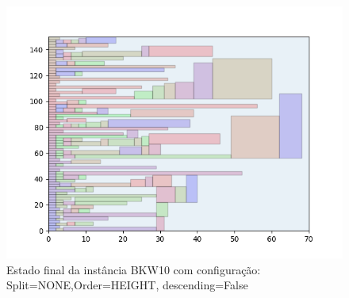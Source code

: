 \begin{figure}[H]
    \centering
    \caption[]{Estado final da instância BKW10 com configuração: Split=NONE,Order=HEIGHT, descending=False}
    \label{fig:bkw10-none-height-false}
    \includegraphics[scale=0.5]{output/figures/bkw/bkw10/none/height/false/000}
\end{figure}